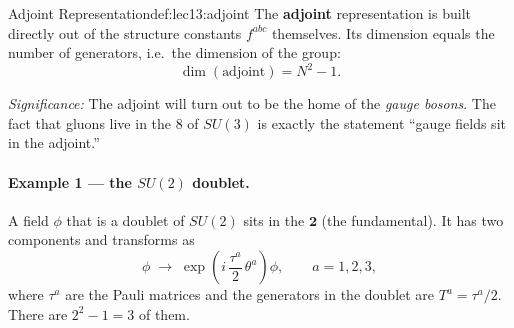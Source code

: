 \documentclass[../main.tex]{subfiles}
\begin{document}
\begin{Definition}{Adjoint Representation}{def:lec13:adjoint}
The \textbf{adjoint} representation is built directly out of the structure constants $f^{abc}$ themselves. Its dimension equals the number of generators, i.e.\ the dimension of the group:
\begin{equation*}
  \dim(\text{adjoint}) = N^2-1 .
\end{equation*}
\end{Definition}

\textit{Significance:} The adjoint will turn out to be the home of the \emph{gauge bosons}. The fact that gluons live in the $8$ of $SU(3)$ is exactly the statement ``gauge fields sit in the adjoint.''

\paragraph{Example 1 --- the $SU(2)$ doublet.}
A field $\phi$ that is a doublet of $SU(2)$ sits in the $\mathbf{2}$ (the fundamental). It has two components and transforms as
\begin{equation}
  \phi \;\to\; \exp\!\left(i\,\frac{\tau^a}{2}\,\theta^a\right)\phi ,
  \qquad a = 1,2,3 ,
  \label{eq:lec13:su2doublet}
\end{equation}
where $\tau^a$ are the Pauli matrices and the generators in the doublet are $T^a = \tau^a/2$. There are $2^2-1=3$ of them.
\end{document}
